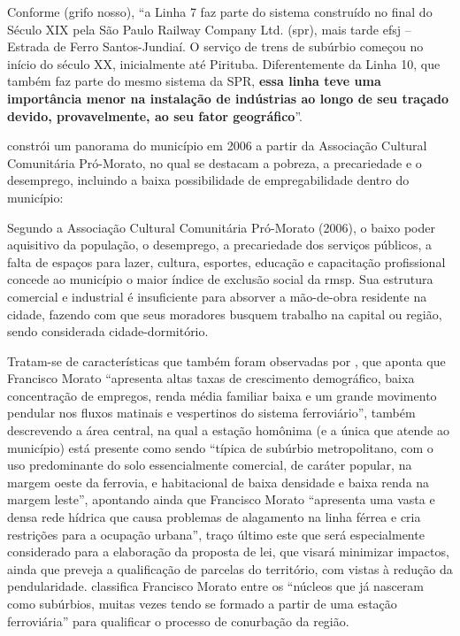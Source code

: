 	Conforme  (grifo nosso), ``a Linha 7 faz parte do sistema construído no final do Século XIX pela São Paulo Railway Company Ltd. (\gls{spr}), mais tarde \gls{efsj} – Estrada de Ferro Santos-Jundiaí. O serviço de trens de subúrbio começou no início do século XX, inicialmente até Pirituba. Diferentemente da Linha 10, que também faz parte do mesmo sistema da SPR, \textbf{essa linha teve uma importância menor na instalação de indústrias ao longo de seu traçado devido, provavelmente, ao seu fator geográfico}''.
	
	
	 constrói um panorama do município em 2006 a partir da Associação Cultural Comunitária Pró-Morato, no qual se destacam a pobreza, a precariedade e o desemprego, incluindo a baixa possibilidade de empregabilidade dentro do município:
	
	\begin{citacao}
		Segundo a Associação Cultural Comunitária Pró-Morato (2006), o baixo poder aquisitivo da população, o desemprego, a precariedade dos serviços públicos, a falta de espaços para lazer, cultura, esportes, educação e capacitação profissional concede ao município o maior índice de exclusão social da \gls{rmsp}. Sua estrutura comercial e industrial é insuficiente para absorver a mão-de-obra residente na cidade, fazendo com que seus moradores busquem trabalho na capital ou região, sendo considerada cidade-dormitório.
	\end{citacao}
	
	Tratam-se de características que também foram observadas por , que aponta que Francisco Morato ``apresenta altas taxas de crescimento demográfico,	baixa concentração de empregos, renda média familiar baixa e um grande movimento pendular nos fluxos matinais e vespertinos do sistema ferroviário'', também descrevendo a área central, na qual a estação homônima (e a única que atende ao município) está presente como sendo ``típica de subúrbio metropolitano, com o uso predominante do solo essencialmente comercial, de caráter popular, na margem oeste da ferrovia, e habitacional de baixa densidade e baixa renda na margem leste'', apontando ainda que Francisco Morato ``apresenta uma vasta e densa rede hídrica que causa problemas de alagamento na linha férrea e cria restrições para a ocupação urbana'', traço último este que será especialmente considerado para a elaboração da proposta de lei, que visará minimizar impactos, ainda que preveja a qualificação de parcelas do território, com vistas à redução da pendularidade.  classifica Francisco Morato entre os ``núcleos que já nasceram como subúrbios, muitas vezes tendo se formado a partir de uma estação ferroviária'' para qualificar o processo de conurbação da região.
	

